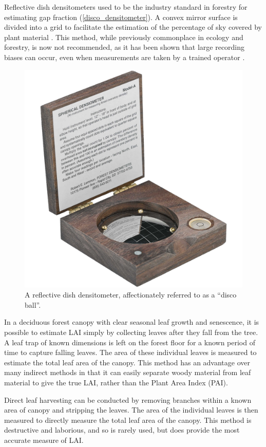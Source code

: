 \documentclass[11pt,a4paper]{article}
\begin{document}
Reflective dish densitometers used to be the industry standard in forestry for estimating gap fraction (\autoref{disco_densitometer}). A convex mirror surface is divided into a grid to facilitate the estimation of the percentage of sky covered by plant material \citep{Lemmon1956}. This method, while previously commonplace in ecology and forestry, is now not recommended, as it has been shown that large recording biases can occur, even when measurements are taken by a trained operator \citep{Korhonen2006}.

\begin{figure}[H]
	\includegraphics[width=0.5\linewidth]{disco_densitometer}
	\caption{A reflective dish densitometer, affectionately referred to as a ``disco ball''.}
	\label{disco_densitometer}
\end{figure}

In a deciduous forest canopy with clear seasonal leaf growth and senescence, it is possible to estimate LAI simply by collecting leaves after they fall from the tree. A leaf trap of known dimensions is left on the forest floor for a known period of time to capture falling leaves. The area of these individual leaves is measured to estimate the total leaf area of the canopy. This method has an advantage over many indirect methods in that it can easily separate woody material from leaf material to give the true LAI, rather than the Plant Area Index (PAI). 

Direct leaf harvesting can be conducted by removing branches within a known area of canopy and stripping the leaves. The area of the individual leaves is then measured to directly measure the total leaf area of the canopy. This method is destructive and laborious, and so is rarely used, but does provide the most accurate measure of LAI.

\printbibliography
\end{document}
